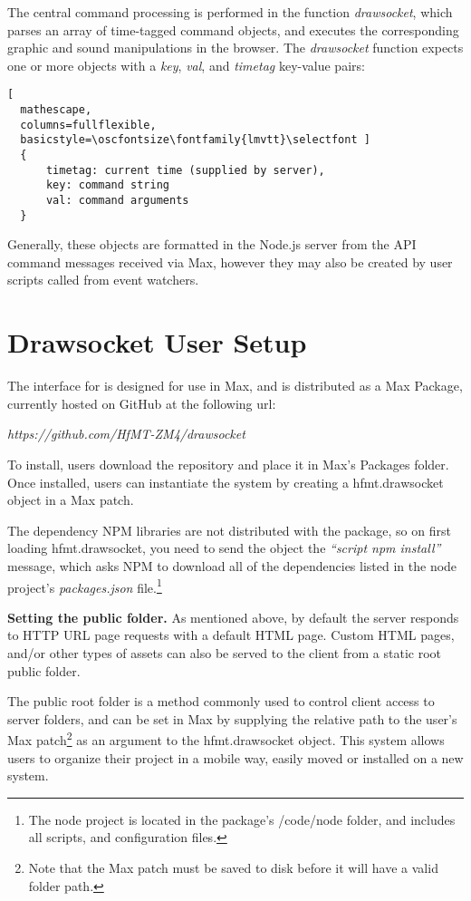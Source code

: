 The central command processing is performed in the function \textit{drawsocket}, which parses an array of time-tagged command objects, and executes the corresponding graphic and sound manipulations in the browser. The \textit{drawsocket} function expects one or more objects with a \textit{key}, \textit{val}, and \textit{timetag} key-value pairs:

\begin{lstlisting}[
  mathescape,
  columns=fullflexible,
  basicstyle=\oscfontsize\fontfamily{lmvtt}\selectfont ]
  {
      timetag: current time (supplied by server),
      key: command string
      val: command arguments
  }
\end{lstlisting}
\noindent
Generally, these objects are formatted in the Node.js server from the API command messages received via Max, however they may also be created by user scripts called from event watchers.

\section{Drawsocket User Setup}\label{sec:setup}
The interface for \drawsocket is designed for use in Max, and is distributed as a Max Package, currently hosted on GitHub at the following url:

\textit{https://github.com/HfMT-ZM4/drawsocket}

To install, users download the repository and place it in Max's Packages folder. Once installed, users can instantiate the \drawsocket system by creating a hfmt.drawsocket object in a Max patch.

The dependency NPM libraries are not distributed with the package, so on first loading hfmt.drawsocket, you need to send the object the \textit{``script npm install''} message, which asks NPM to download all of the dependencies listed in the node project's \textit{packages.json} file.\footnote{The node project is located in the package's /code/node folder, and includes all scripts, and configuration files.}

\medskip
\noindent
\textbf{Setting the public folder.}  As mentioned above, by default the \drawsocket server responds to HTTP URL page requests with a default HTML page. 
Custom HTML pages, and/or other types of assets can also be served to the client from a static root public folder. 

The public root folder is a method commonly used to control client access to server folders, and can be set in Max by supplying the relative path to the user's Max patch\footnote{Note that the Max patch must be saved to disk before it will have a valid folder path.} as an argument to the hfmt.drawsocket object.
This system allows users to organize their project in a mobile way, easily moved or installed on a new system.

